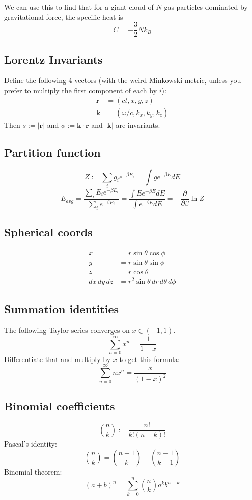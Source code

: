\documentclass[12pt]{article}
\begin{document}
We can use this to find that for a giant cloud of $N$ gas particles dominated by gravitational force, the specific heat is
\[ C = - \frac{3}{2} N k_B \]

\subsection{Lorentz Invariants}
Define the following 4-vectors (with the weird Minkowski metric, unless you prefer to multiply the first component of each by $i$):
\begin{align*}
    \boldsymbol{r} &= (ct, x, y, z) \\
    \boldsymbol{k} &= (\omega/c, k_x, k_y, k_z)
\end{align*}
Then $s := |\boldsymbol{r}|$ and $\phi := \boldsymbol{k} \cdot \boldsymbol{r}$ and $|\boldsymbol{k}|$ are invariants.

\subsection{Partition function}
\[ Z := \sum_i g_i e^{-\beta E_i} = \int g e^{- \beta E} dE \]
\[E_{avg} = \frac{\sum_i E_i e^{-\beta E_i}}{\sum_i e^{-\beta E_i}} = \frac{\int E e^{-\beta E} dE}{\int e^{-\beta E} dE}  = - \frac{\partial}{\partial \beta} \ln Z\]

\subsection{Spherical coords}
\begin{align*}
    x &= r \sin \theta \cos \phi \\
    y &= r \sin \theta \sin \phi \\
    z &= r \cos \theta \\
    dx \, dy \, dz &= r^2 \sin \theta \, dr \, d\theta \, d\phi
\end{align*}

\subsection{Summation identities}
The following Taylor series converges on $x \in (-1, 1)$.
\[\sum_{n=0}^\infty x^n = \frac{1}{1-x} \]
Differentiate that and multiply by $x$ to get this formula:
\[\sum_{n=0}^\infty nx^n = \frac{x}{(1-x)^2} \]

\subsection{Binomial coefficients}
\[ \binom{n}{k} := \frac{n!}{k! (n-k)!} \]
Pascal's identity:
\[\binom{n}{k} = \binom{n-1}{k} + \binom{n-1}{k-1}\]
Binomial theorem:
\[(a+b)^n = \sum_{k=0}^n \binom{n}{k} a^k b^{n-k}\]
\end{document}

